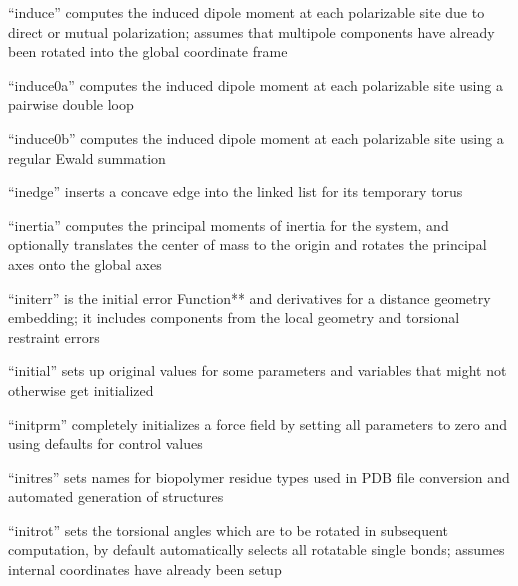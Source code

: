 \documentclass[letterpaper,11pt,english]{sphinxmanual}
\begin{document}

“induce” computes the induced dipole moment at each polarizable site due to direct or mutual polarization; assumes that multipole components have already been rotated into the global coordinate frame


“induce0a” computes the induced dipole moment at each polarizable site using a pairwise double loop


“induce0b” computes the induced dipole moment at each polarizable site using a regular Ewald summation


“inedge” inserts a concave edge into the linked list for its temporary torus


“inertia” computes the principal moments of inertia for the system, and optionally translates the center of mass to the origin and rotates the principal axes onto the global axes


“initerr” is the initial error Function** and derivatives for a distance geometry embedding; it includes components from the local geometry and torsional restraint errors


“initial” sets up original values for some parameters and variables that might not otherwise get initialized


“initprm” completely initializes a force field by setting all parameters to zero and using defaults for control values


“initres” sets names for biopolymer residue types used in PDB file conversion and automated generation of structures


“initrot” sets the torsional angles which are to be rotated in subsequent computation, by default automatically selects all rotatable single bonds; assumes internal coordinates have already been setup

\end{document}
